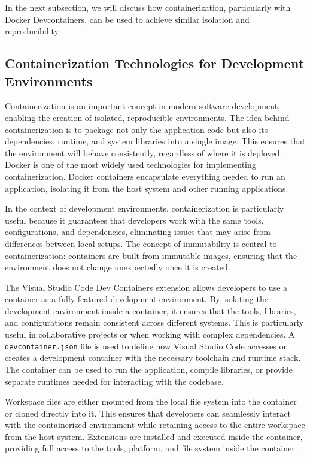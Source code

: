 In the next subsection, we will discuss how containerization, particularly with
Docker Devcontainers, can be used to achieve similar isolation and reproducibility.

\subsection{Containerization Technologies for Development Environments}

Containerization is an important concept in modern software development, enabling
the creation of isolated, reproducible environments. The idea behind containerization
is to package not only the application code but also its dependencies, runtime, and
system libraries into a single image. This ensures that the environment will behave
consistently, regardless of where it is deployed. Docker is one of the most widely
used technologies for implementing containerization. Docker containers encapsulate
everything needed to run an application, isolating it from the host system and other
running applications.

In the context of development environments, containerization is particularly useful
because it guarantees that developers work with the same tools, configurations, and
dependencies, eliminating issues that may arise from differences between local setups.
The concept of immutability is central to containerization: containers are built from
immutable images, ensuring that the environment does not change unexpectedly once it
is created.

The Visual Studio Code Dev Containers extension allows developers to use a container
as a fully-featured development environment. By isolating the development environment
inside a container, it ensures that the tools, libraries, and configurations remain
consistent across different systems. This is particularly useful in collaborative
projects or when working with complex dependencies. A \texttt{devcontainer.json}
file is used to define how Visual Studio Code accesses or creates a development
container with the necessary toolchain and runtime stack. The container can be used
to run the application, compile libraries, or provide separate runtimes needed
for interacting with the codebase.

Workspace files are either mounted from the local file system into the container
or cloned directly into it. This ensures that developers can seamlessly interact
with the containerized environment while retaining access to the entire workspace
from the host system. Extensions are installed and executed inside the container,
providing full access to the tools, platform, and file system inside the container.

